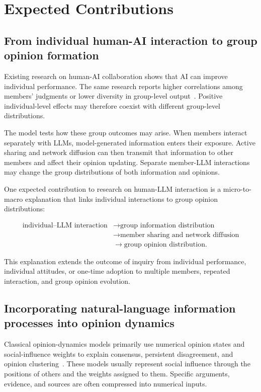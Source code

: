 \documentclass[11pt,a4paper]{article}
\begin{document}
\section{Expected Contributions}

\subsection{From individual human-AI interaction to group opinion formation}

Existing research on human-AI collaboration shows that AI can improve individual performance. The same research reports higher correlations among members' judgments or lower diversity in group-level output~\citep{fugener2021,doshi2024}. Positive individual-level effects may therefore coexist with different group-level distributions.

The model tests how these group outcomes may arise. When members interact separately with LLMs, model-generated information enters their exposure. Active sharing and network diffusion can then transmit that information to other members and affect their opinion updating. Separate member-LLM interactions may change the group distributions of both information and opinions.

One expected contribution to research on human-LLM interaction is a micro-to-macro explanation that links individual interactions to group opinion distributions:

\begin{equation*}
\begin{aligned}\text{individual--LLM interaction} &\rightarrow \text{group information distribution} \\
&\rightarrow \text{member sharing and network diffusion} \\
&\rightarrow \text{group opinion distribution}.\end{aligned}
\end{equation*}

This explanation extends the outcome of inquiry from individual performance, individual attitudes, or one-time adoption to multiple members, repeated interaction, and group opinion evolution.

\subsection{Incorporating natural-language information processes into opinion dynamics}

Classical opinion-dynamics models primarily use numerical opinion states and social-influence weights to explain consensus, persistent disagreement, and opinion clustering~\citep{degroot1974,friedkin1990,hegselmann2002}. These models usually represent social influence through the positions of others and the weights assigned to them. Specific arguments, evidence, and sources are often compressed into numerical inputs.
\end{document}
